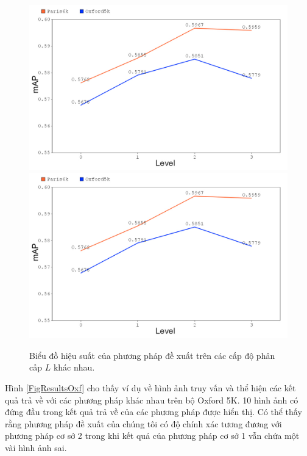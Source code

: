 \begin{figure}[!htbp]
  \begin{center}
    \leavevmode
    \ifpdf
      \includegraphics[scale=0.32]{levels}
    \else
      \includegraphics[scale=0.32]{levels}
    \fi
    \caption[Biểu đồ hiệu suất của phương pháp đề xuất trên các cấp độ phân cấp khác nhau]{Biểu đồ hiệu suất của phương pháp đề xuất trên các cấp độ phân cấp $L$ khác nhau.}
    \label{FigResLevels}
  \end{center}
\end{figure}

Hình \ref{FigResultsOxf} cho thấy ví dụ về hình ảnh truy vấn và thể hiện các kết quả trả về với các phương pháp khác nhau trên bộ Oxford 5K. 10 hình ảnh có đứng đầu trong kết quả trả về của các phương pháp được hiển thị. Có thể thấy rằng phương pháp đề xuất của chúng tôi có độ chính xác tương đương với phương pháp cơ sở 2 trong khi kết quả của phương pháp cơ sở 1 vẫn chứa một vài hình ảnh sai.

